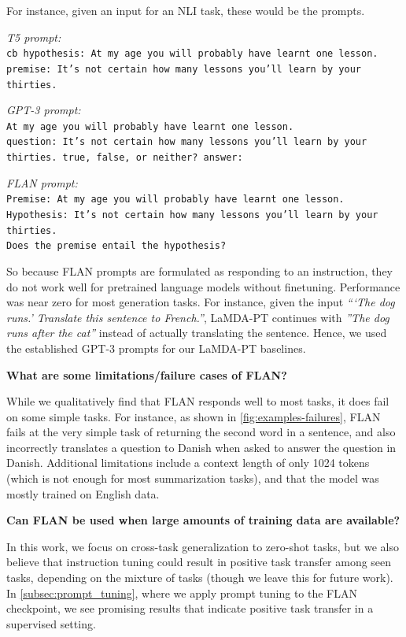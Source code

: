 \documentclass{article} %
\newcommand{\textttsmall}[1]{\texttt{{\small#1}}}
\newcommand{\flan}{FLAN}
\newcommand{\baselm}{LaMDA-PT}
\begin{document}
For instance, given an input for an NLI task, these would be the prompts.

\textit{T5 prompt:} \\
\textttsmall{cb hypothesis: At my age you will probably have learnt one lesson. premise: It's not certain how many lessons you'll learn by your thirties.}

\textit{GPT-3 prompt:} \\
\textttsmall{At my age you will probably have learnt one lesson.} \\
\textttsmall{question: It's not certain how many lessons you'll learn by your thirties. true, false, or neither?
answer:}

\textit{FLAN prompt:} \\
\textttsmall{Premise: At my age you will probably have learnt one  lesson.}\\
\textttsmall{Hypothesis: It's not certain how many lessons you'll learn by your thirties.}\\
\textttsmall{Does the premise entail the hypothesis?}

So because \flan{} prompts are formulated as responding to an instruction, they do not work well for pretrained language models without finetuning. 
Performance was near zero for most generation tasks. 
For instance, given the input \textit{```The dog runs.' Translate this sentence to French.''}, \baselm{} continues with \textit{''The dog runs after the cat''} instead of actually translating the sentence. Hence, we used the established GPT-3 prompts for our \baselm{} baselines.

\vspace{4mm}
\textbf{What are some limitations/failure cases of \flan{}?}

While we qualitatively find that \flan{} responds well to most tasks, it does fail on some simple tasks. 
For instance, as shown in \cref{fig:examples-failures}, \flan{} fails at the very simple task of returning the second word in a sentence, and also incorrectly translates a question to Danish when asked to answer the question in Danish.
Additional limitations include a context length of only 1024 tokens (which is not enough for most summarization tasks), and that the model was mostly trained on English data.

\vspace{4mm}
\textbf{Can \flan{} be used when large amounts of training data are available?}


In this work, we focus on cross-task generalization to zero-shot tasks, but we also believe that instruction tuning could result in positive task transfer among seen tasks, depending on the mixture of tasks (though we leave this for future work). 
In \cref{subsec:prompt_tuning}, where we apply prompt tuning to the \flan{} checkpoint, we see promising results that indicate positive task transfer in a supervised setting.
\end{document}
